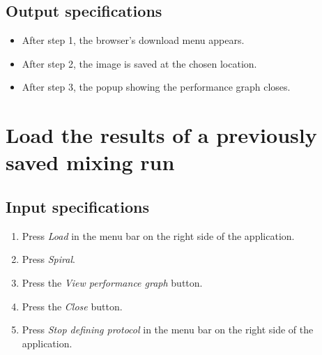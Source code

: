 \subsection*{Output specifications}
\begin{itemize}
\item After step 1, the browser's download menu appears.
\item After step 2, the image is saved at the chosen location.
\item After step 3, the popup showing the performance graph closes.
\end{itemize}
 
\section{Load the results of a previously saved mixing run}

\subsection*{Input specifications}
\begin{enumerate}
\item Press \emph{Load} in the menu bar on the right side of the application.
\item Press \emph{Spiral}.
\item Press the \emph{View performance graph} button.
\item Press the \emph{Close} button.
\item Press \emph{Stop defining protocol} in the menu bar on the right side of the application.
\end{enumerate}

